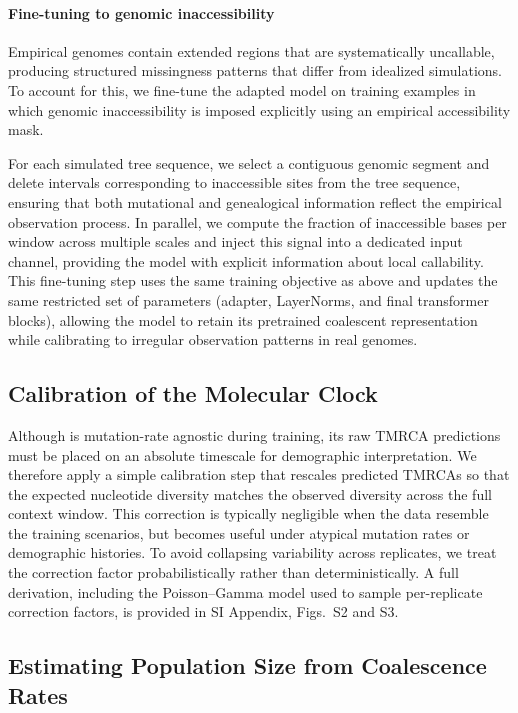 \documentclass[9pt,twocolumn,twoside]{pnas-new}
\begin{document}
{\paragraph{Fine-tuning to genomic inaccessibility}
Empirical genomes contain extended regions that are systematically uncallable,
producing structured missingness patterns that differ from idealized simulations.
To account for this, we fine-tune the adapted model on training examples in which
genomic inaccessibility is imposed explicitly using an empirical accessibility mask.

For each simulated tree sequence, we select a contiguous genomic segment and delete
intervals corresponding to inaccessible sites from the tree sequence, ensuring that
both mutational and genealogical information reflect the empirical observation
process.
In parallel, we compute the fraction of inaccessible bases per window across multiple
scales and inject this signal into a dedicated input channel, providing the model
with explicit information about local callability.
This fine-tuning step uses the same training objective as above and updates the same
restricted set of parameters (adapter, LayerNorms, and final transformer blocks),
allowing the model to retain its pretrained coalescent representation while
calibrating to irregular observation patterns in real genomes.


\subsection*{Calibration of the Molecular Clock}
\label{correction}

Although \cxtkit is mutation-rate agnostic during training, 
its raw TMRCA predictions must be placed on an absolute timescale for demographic interpretation.
We therefore apply a simple calibration step that rescales predicted TMRCAs 
so that the expected nucleotide diversity matches 
the observed diversity across the full context window. 
This correction is typically negligible when the data resemble the training scenarios, 
but becomes useful under atypical mutation rates or demographic histories. 
To avoid collapsing variability across replicates, 
we treat the correction factor probabilistically rather than deterministically. 
A full derivation, including the Poisson–Gamma model used to sample per-replicate correction factors, 
is provided in SI Appendix, Figs.~S2 and S3.

\subsection*{Estimating Population Size from Coalescence Rates}

}
\end{document}
